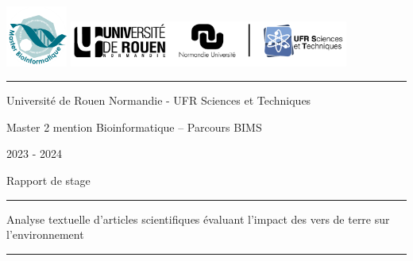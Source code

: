\documentclass{book}
\begin{document}

\newpage
\thispagestyle{empty}
\vspace{-5cm}
\includegraphics[height=2cm]{univ.png}
\hfill
\includegraphics[height=1.5cm]{URN_NU_ST.jpg}

\vspace{0.5cm}
\hrule
\vspace{0.5cm}

\begin{center}
    \large{Université de Rouen Normandie - UFR Sciences et Techniques}
\end{center}

\begin{center}
    \large{Master 2 mention Bioinformatique – Parcours BIMS}
\end{center}

\begin{center}
    \large{2023 - 2024}
\end{center}

\vspace{1cm}

\begin{center}
    \Large{Rapport de stage}
\end{center}

\begin{center}
    \vspace{1cm}
    \hrule
    \vspace{1cm}
    \huge{Analyse textuelle d'articles scientifiques évaluant l'impact des vers
        de terre sur l'environnement }
    \vspace{1cm}
    \hrule
    \vspace{1cm}
\end{center}
\end{document}
